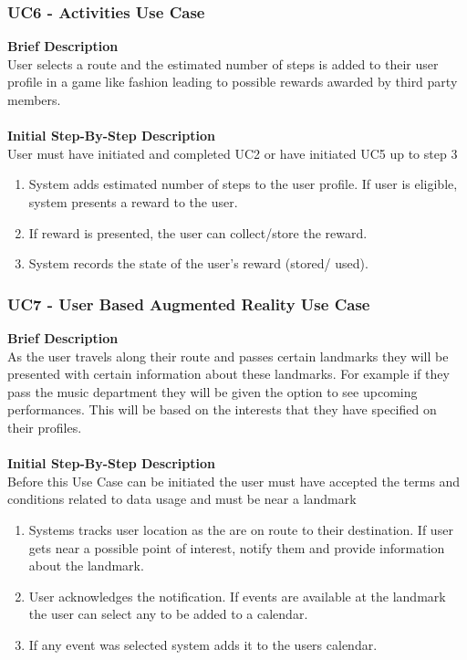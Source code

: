 \documentclass[a4paper, 12pt, one column, aas_macros]{article}
\begin{document}
\subsubsection{UC6 - Activities Use Case}
\textbf{Brief Description}\\
User selects a route and the estimated number of steps is added to their user profile in a game like fashion leading to possible rewards awarded by third party members.\\
\\\textbf{Initial Step-By-Step Description}\\
User must have initiated and completed UC2 or have initiated UC5 up to step 3
\begin{enumerate}
\item System adds estimated number of steps to the user profile. If user is eligible, system presents a reward to the user.
\item If reward is presented, the user can collect/store the reward.
\item System records the state of the user’s reward (stored/ used).
\end{enumerate}

\subsubsection{UC7 - User Based Augmented Reality Use Case}
\textbf{Brief Description}\\
As the user travels along their route and passes certain landmarks they will be presented with certain information about these landmarks. For example if they pass the music department they will be given the option to see upcoming performances. This will be based on the interests that they have specified on their profiles.\\
\\\textbf{Initial Step-By-Step Description}\\
Before this Use Case can be initiated the user must have accepted the terms and conditions related to data usage and must be near a landmark
\begin{enumerate}
\item Systems tracks user location as the are on route to their destination. If user gets near a possible point of interest, notify them and provide information about the landmark.
\item User acknowledges the notification. If events are available at the landmark the user can select any to be added to a calendar.
\item If any event was selected system adds it to the users calendar.
\end{enumerate}
\end{document}
